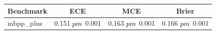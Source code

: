 \begin{tabular}{lccc}
\toprule
Benchmark & ECE & MCE & Brier \\
\midrule
mbpp_plus & 0.151 $\\pm$ 0.001 & 0.163 $\\pm$ 0.001 & 0.166 $\\pm$ 0.001 \\
\bottomrule
\end{tabular}
